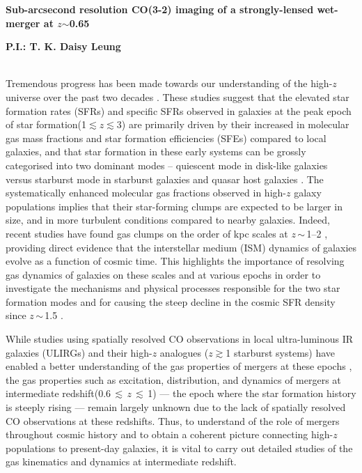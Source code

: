 \documentclass[11pt,a4paper,twoside,graphicx,color]{article}
\newcommand{\cco}{\mbox{CO(3-2)}\xspace}
\newcommand{\ssim}{\,$\sim$\,}
\newcommand{\SF}{star formation\xspace}
\newcommand{\galpop}{galaxy populations\xspace}
\newcommand{\SB}{starburst\xspace}
\newcommand{\highz}{high-$z$\xspace}
\newcommand{\atinterz}{at intermediate redshift\xspace}
\newcommand{\obs}{observations\xspace}
\begin{document}
%
%
\begin{center}{\LARGE \bf
Sub-arcsecond resolution \cco imaging of a strongly-lensed wet-merger at $z$$\sim$0.65
}\end{center}
\centerline{\bf P.I.: T. K. Daisy Leung}
\vspace{0.5em}
 \\
\indent Tremendous progress has been made towards our understanding of the \highz
universe over the past two decades \citep[see recent reviews by][]{CW13,Madau14a, Casey14a}. These studies
suggest that the elevated \SF rates (SFRs) and specific SFRs observed in galaxies at
the peak epoch of \SF (1$\lesssim$$z$$\lesssim$3) are
primarily driven by their increased in molecular gas mass fractions and \SF efficiencies (SFEs) compared to
local galaxies, and that \SF in these early systems can be grossly categorised into
two dominant modes -- quiescent mode in disk-like galaxies versus starburst mode in \SB galaxies and quasar host galaxies \citep[e.g.][]{Sargent12a}. 
The systematically enhanced molecular gas fractions observed in \highz
\galpop implies that their star-forming clumps are expected to be larger in size, and in
more turbulent conditions 
compared to nearby galaxies.  %
Indeed, recent studies have found gas clumps on the order of 
kpc scales at $z$\ssim1--2 \citep[e.g.][]{Genzel11a, Swinbank12a, Swinbank12b}, 
providing direct evidence that the
interstellar medium (ISM) dynamics of galaxies evolve as a function of cosmic time. This
highlights the importance of resolving gas dynamics of galaxies on these scales 
and at various epochs in order to investigate the
mechanisms and physical processes responsible for %
the two \SF modes and for causing the steep decline in the cosmic SFR density since $z$\ssim1.5 \citep[e.g.][]{Lagos11a,Popping12a}.

While studies using spatially resolved CO \obs in
local ultra-luminous IR galaxies (ULIRGs) and their \highz analogues ($z$$\gtrsim$1 \SB systems)
have enabled a better understanding of the gas properties of mergers at these epochs \citep[e.g.][]{Engel10a,Bothwell10a},
the gas properties such as excitation, distribution, and dynamics of mergers 
\atinterz (0.6\,$\lesssim$\,$z$\,$\lesssim$\,1) --- the epoch where the \SF history is steeply rising --- remain largely unknown
due to the lack of spatially resolved CO observations at these redshifts.
Thus, to understand of the role of mergers throughout cosmic history and
to obtain a coherent picture connecting \highz populations to present-day galaxies, 
it is vital to carry out detailed studies of the gas kinematics and dynamics \atinterz.
\end{document}
